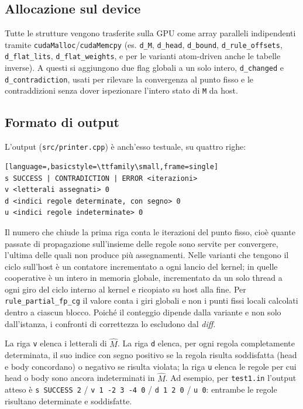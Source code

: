 \documentclass[11pt,a4paper]{article}
\begin{document}
\subsection{Allocazione sul device}

Tutte le strutture vengono trasferite sulla GPU come array paralleli indipendenti tramite
\texttt{cudaMalloc}/\texttt{cudaMemcpy} (es. \texttt{d\_M}, \texttt{d\_head}, \texttt{d\_bound},
\texttt{d\_rule\_offsets}, \texttt{d\_flat\_lits}, \texttt{d\_flat\_weights}, e per le varianti
atom-driven anche le tabelle inverse). A questi si aggiungono due flag globali a un solo intero,
\texttt{d\_changed} e \texttt{d\_contradiction}, usati per rilevare la convergenza al punto fisso e
le contraddizioni senza dover ispezionare l'intero stato di \texttt{M} da host.

\subsection{Formato di output}

L'output (\texttt{src/printer.cpp}) è anch'esso testuale, su quattro righe:

\begin{lstlisting}[language=,basicstyle=\ttfamily\small,frame=single]
s SUCCESS | CONTRADICTION | ERROR <iterazioni>
v <letterali assegnati> 0
d <indici regole determinate, con segno> 0
u <indici regole indeterminate> 0
\end{lstlisting}

Il numero che chiude la prima riga conta le iterazioni del punto fisso, cioè quante passate di
propagazione sull'insieme delle regole sono servite per convergere, l'ultima delle quali non
produce più assegnamenti. Nelle varianti che tengono il ciclo sull'host è un contatore incrementato
a ogni lancio del kernel; in quelle cooperative è un intero in memoria globale, incrementato da un
solo thread a ogni giro del ciclo interno al kernel e ricopiato su host alla fine. Per
\texttt{rule\_partial\_fp\_cg} il valore conta i giri globali e non i punti fissi locali calcolati
dentro a ciascun blocco. Poiché il conteggio dipende dalla variante e non solo dall'istanza, i
confronti di correttezza lo escludono dal \emph{diff}.

La riga \texttt{v} elenca i letterali di $\hat M$. La riga \texttt{d} elenca, per ogni regola
completamente determinata, il suo indice con segno positivo se la regola risulta soddisfatta
(head e body concordano) o negativo se risulta violata; la riga \texttt{u} elenca le regole per cui
head o body sono ancora indeterminati in $\hat M$. Ad esempio, per \texttt{test1.in} l'output atteso
è \texttt{s SUCCESS 2} / \texttt{v 1 -2 3 -4 0} / \texttt{d 1 2 0} / \texttt{u 0}: entrambe le regole
risultano determinate e soddisfatte.
\end{document}
